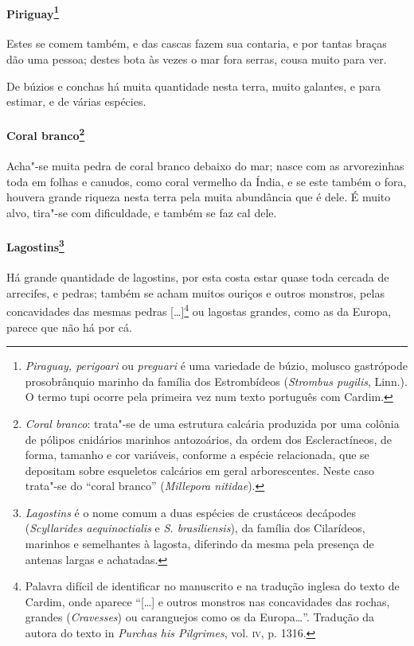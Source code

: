 \paragraph{Piriguay\footnote{ \textit{Piraguay, perigoari} ou
\textit{preguari} é uma variedade de búzio, molusco gastrópode
prosobrânquio marinho da família dos Estrombídeos (\textit{Strombus
pugilis}, Linn.). O termo tupi ocorre pela primeira vez num texto
português com Cardim.}} Estes se comem também, e das cascas
fazem sua contaria, e por tantas braças dão uma pessoa; destes bota às
vezes o mar fora serras, cousa muito para ver. 

 De búzios e conchas há muita quantidade nesta terra, muito galantes, e
para estimar, e de várias espécies.

\paragraph{Coral branco\footnote{ \textit{Coral branco}: trata"-se de
uma estrutura calcária produzida por uma colônia de pólipos cnidários
marinhos antozoários, da ordem dos Escleractíneos, de forma, tamanho e
cor variáveis, conforme a espécie relacionada, que se depositam sobre
esqueletos calcários em geral arborescentes. Neste caso trata"-se do
``coral branco'' (\textit{Millepora nitidae}).}} Acha"-se muita
pedra de coral branco debaixo do mar; nasce com as arvorezinhas toda em
folhas e canudos, como coral vermelho da Índia, e se este também o
fora, houvera grande riqueza nesta terra pela muita abundância que é
dele. É muito alvo, tira"-se com dificuldade, e também se faz cal dele.

\paragraph{Lagostins\footnote{ \textit{Lagostins} é o nome comum a
duas espécies de crustáceos decápodes (\textit{Scyllarides
aequinoctialis} e \textit{S. brasiliensis}), da família dos Cilarídeos,
marinhos e semelhantes à lagosta, diferindo da mesma pela presença de
antenas largas e achatadas.}} Há grande quantidade de
lagostins, por esta costa estar quase toda cercada de arrecifes, e
pedras; também se acham muitos ouriços e outros monstros, pelas
concavidades das mesmas pedras [\ldots{}]\footnote{ Palavra difícil de
identificar no manuscrito e na tradução inglesa do texto de Cardim,
onde aparece ``[\ldots{}] e outros monstros nas concavidades das rochas,
grandes (\textit{Cravesses}) ou caranguejos como os da Europa\ldots{}''.
Tradução da autora do texto in \textit{Purchas his Pilgrimes}, vol. \textsc{iv},
p. 1316.} ou lagostas grandes, como as da Europa, parece que não há por cá.


